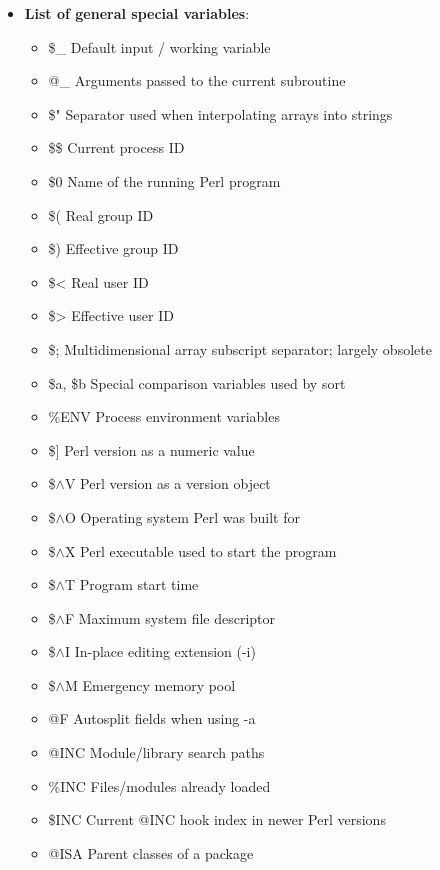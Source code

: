 \documentclass{report}
\begin{document}
\begin{itemize}
        \item \textbf{List of general special variables}: 
            \begin{itemize}
                \item \$\_	Default input / working variable
                \item @\_	Arguments passed to the current subroutine
                \item \$"	Separator used when interpolating arrays into strings
                \item \$\$	Current process ID
                \item \$0	Name of the running Perl program
                \item \$(	Real group ID
                \item \$)	Effective group ID
                \item \$<	Real user ID
                \item \$>	Effective user ID
                \item \$;	Multidimensional array subscript separator; largely obsolete
                \item \$a, \$b	Special comparison variables used by sort
                \item \%ENV	Process environment variables
                \item \$]	Perl version as a numeric value
                \item \$$\land$V	Perl version as a version object
                \item \$$\land$O	Operating system Perl was built for
                \item \$$\land$X	Perl executable used to start the program
                \item \$$\land$T	Program start time
                \item \$$\land$F	Maximum system file descriptor
                \item \$$\land$I	In-place editing extension (-i)
                \item \$$\land$M	Emergency memory pool
                \item @F	Autosplit fields when using -a
                \item @INC	Module/library search paths
                \item \%INC	Files/modules already loaded
                \item \$INC	Current @INC hook index in newer Perl versions
                \item @ISA	Parent classes of a package

\end{itemize}
\end{itemize}
\end{document}
